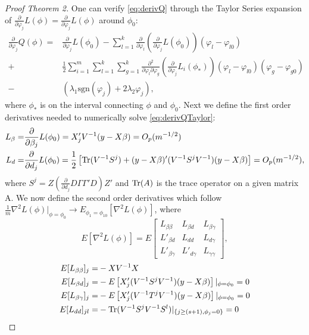 \begin{proof}[Proof Theorem 2]
One can verify \eqref{eq:derivQ} through the Taylor Series expansion  of $\frac{\partial}{\partial\varphi_j}L(\phi)=\frac{\partial}{\partial\varphi_j}L(\phi)$ around $\phi_0$:
\begin{align}
\label{eq:derivQTaylor}
\frac{\partial}{\partial\varphi_j} Q(\phi) =&\frac{\partial}{\partial\varphi_j}L(\phi_0) -\sum_{l=1}^{k}\frac{\partial}{\partial\varphi_l} \left(\frac{\partial}{\partial\varphi_j}L(\phi_0)\right) (\varphi_l-\varphi_{l0})
\\
+&\frac{1}{2} \sum_{i=1}^{m} \sum_{l=1}^{k} \sum_{g=1}^{k} \frac{\partial^2}{\partial\varphi_l\partial\varphi_g} \left(\frac{\partial}{\partial\varphi_j}L_i(\phi_*)\right) (\varphi_l-\varphi_{l0}) (\varphi_g-\varphi_{g0}) \nonumber
\\
-&\left( \lambda_1\text{sgn}(\varphi_j)+2\lambda_2\varphi_j\right), \nonumber
\end{align}
where $\phi_*$ is on the interval connecting $\phi$ and $\phi_0$. Next we define the first order derivatives needed to numerically solve \eqref{eq:derivQTaylor}:
\begin{align*}
L_{\beta}=&\frac{\partial}{\partial\beta_j}L(\phi_0)=X'_jV^{-1}(y-X\beta)=O_p(m^{-1/2})\\
L_{d}=&\frac{\partial}{\partial d_j}L(\phi_0)=\frac{1}{2}\left[ \operatorname{Tr}(V^{-1}S^j)+(y-X\beta)'(V^{-1}S^jV^{-1})(y-X\beta)\right]=O_p(m^{-1/2}),
\end{align*}
where $S^j=Z(\frac{\partial}{\partial d_j}D\Gamma\Gamma'D)Z'$ and $\operatorname{Tr}(A)$ is the trace operator on a given matrix A. We now define the second order derivatives which follow $\frac{1}{m}\nabla^2L(\phi)|_{\phi=\phi_0}\rightarrow E_{\phi_1=\phi_{10}}[\nabla^2L(\phi)]$, where
\begin{equation*}
E[\nabla^2L(\phi)]=E
\left[ \begin{array}{ccc}
L_{\beta\beta}&L_{\beta d}&L_{\beta\gamma}\\
L'_{\beta d}&L_{dd}&L_{d\gamma}\\
L'_{\beta\gamma}&L'_{d\gamma}&L_{\gamma\gamma}
\end{array}\right],
\end{equation*}
\begin{align*}
E[L_{\beta\beta}]_j=&-XV^{-1}X\\
E[L_{\beta d}]_j=&-E\left[X'_j(V^{-1}S^jV^{-1})(y-X\beta)\right]|_{\phi=\phi_0}=0\\
E[L_{\beta\gamma}]_j=&-E\left[X'_j(V^{-1}T^jV^{-1})(y-X\beta)\right]|_{\phi=\phi_0}=0 \nonumber\\
E[L_{dd}]_{jl}=&-\Tr(V^{-1}S^jV^{-1}S^l)|_{\left\lbrace j\ge (s+1),\phi_j=0\right\rbrace }=0\\

\end{align*}
\end{proof}
